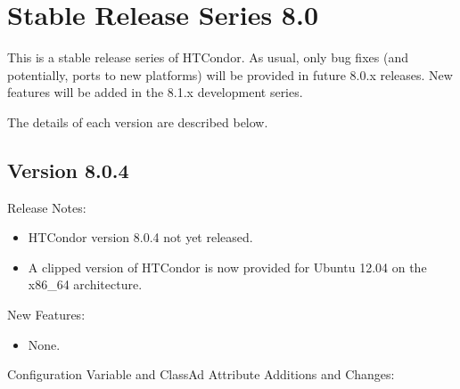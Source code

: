 
\section{\label{sec:History-8-0}Stable Release Series 8.0}

This is a stable release series of HTCondor.
As usual, only bug fixes (and potentially, ports to new platforms)
will be provided in future 8.0.x releases.
New features will be added in the 8.1.x development series.

The details of each version are described below.

\subsection*{\label{sec:New-8-0-4}Version 8.0.4}

\noindent Release Notes:

\begin{itemize}

\item HTCondor version 8.0.4 not yet released.

\item A clipped version of HTCondor is now provided for Ubuntu 12.04 
on the x86\_64 architecture.

\end{itemize}


\noindent New Features:

\begin{itemize}

\item None.

\end{itemize}

\noindent Configuration Variable and ClassAd Attribute Additions and Changes:

